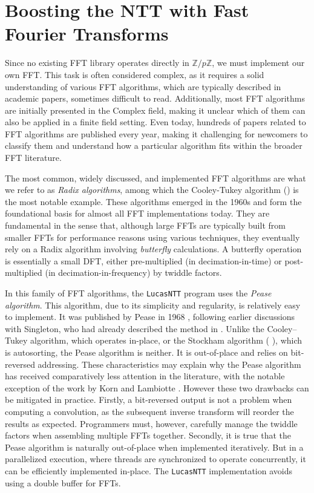 \documentclass{article}
\begin{document}
\section{Boosting the NTT with Fast Fourier Transforms}

Since no existing FFT library operates directly in $\mathbb{Z}/p\mathbb{Z}$, we must implement our own FFT. This task is often considered complex, as it requires a solid understanding of various FFT algorithms, which are typically described in academic papers, sometimes difficult to read. Additionally, most FFT algorithms are initially presented in the Complex field, making it unclear which of them can also be applied in a finite field setting. Even today, hundreds of papers related to FFT algorithms are published every year, making it challenging for newcomers to classify them and understand how a particular algorithm fits within the broader FFT literature.

The most common, widely discussed, and implemented FFT algorithms are what we refer to as \textit{Radix algorithms}, among which the Cooley-Tukey algorithm (\cite{CT65}) is the most notable example. These algorithms emerged in the 1960s and form the foundational basis for almost all FFT implementations today. They are fundamental in the sense that, although large FFTs are typically built from smaller FFTs for performance reasons using various techniques, they eventually rely on a Radix algorithm involving \emph{butterfly} calculations. A butterfly operation is essentially a small DFT, either pre-multiplied (in decimation-in-time) or post-multiplied (in decimation-in-frequency) by twiddle factors.

In this family of FFT algorithms, the \texttt{LucasNTT} program uses the \textit{Pease algorithm}. This algorithm, due to its simplicity and regularity, is relatively easy to implement. It was published by Pease in 1968 \cite{Pea68}, following earlier discussions with Singleton, who had already described the method in \cite{Sin67a}. Unlike the Cooley–Tukey algorithm, which operates in-place, or the Stockham algorithm (\cite{Sto66} \cite{CCFHKLMNRW67}), which is autosorting, the Pease algorithm is neither. It is out-of-place and relies on bit-reversed addressing. These characteristics may explain why the Pease algorithm has received comparatively less attention in the literature, with the notable exception of the work by Korn and Lambiotte \cite{KL79}. However these two drawbacks can be mitigated in practice. Firstly, a bit-reversed output is not a problem when computing a convolution, as the subsequent inverse transform will reorder the results as expected. Programmers must, however, carefully manage the twiddle factors when assembling multiple FFTs together. Secondly, it is true that the Pease algorithm is naturally out-of-place when implemented iteratively. But in a parallelized execution, where threads are synchronized to operate concurrently, it can be efficiently implemented in-place. The \texttt{LucasNTT} implementation avoids using a double buffer for FFTs.
\end{document}
